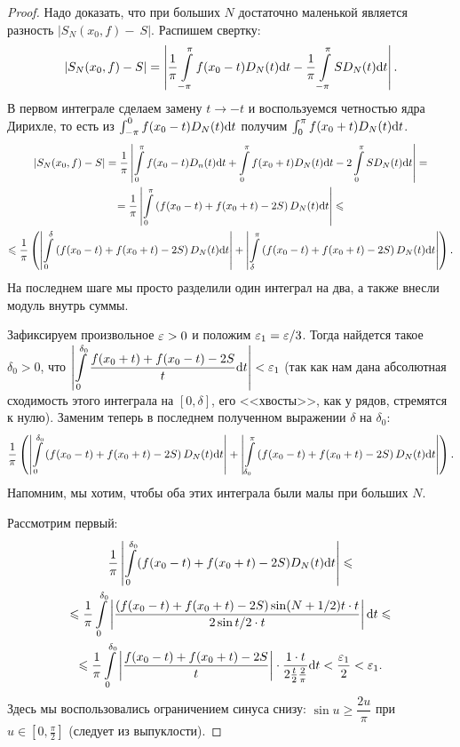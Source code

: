 \begin{proof}
Надо доказать, что при больших $N$ достаточно маленькой является разность $|S_N(x_0, f) -~S|$. Распишем свертку:
\begin{gather*}
|S_N(x_0, f) - S| = \left| \dfrac{1}{\pi} \int\limits_{-\pi}^{\pi}f(x_0 - t)D_N(t)\mathrm{d} t - \dfrac{1}{\pi} \int\limits_{-\pi}^{\pi}SD_N(t)\mathrm{d} t \right|.
\end{gather*}
В первом интеграле сделаем замену $t \to -t$ и воспользуемся четностью ядра Дирихле, то есть из $\int_{-\pi}^{0}f(x_0 - t)D_N(t)\mathrm{d} t$ получим $\int_0^\pi f(x_0 + t)D_N(t)\mathrm{d} t$.
\begin{gather*}
|S_N(x_0, f) - S| = \dfrac{1}{\pi} \left| \int\limits_0^\pi f(x_0 - t)D_n(t)\mathrm{d} t + \int\limits_0^{\pi} f(x_0 + t)D_N(t)\mathrm{d} t - 2\int\limits_0^\pi SD_N(t) \mathrm{d} t \right| = \\ = \dfrac{1}{\pi} \left| \int\limits_0^\pi \left( f(x_0 - t) + f(x_0 + t) - 2S  \right) D_N(t) \mathrm{d} t \right| \leqslant  \\
\leqslant \dfrac{1}{\pi} \left( \left| \int\limits_0^\delta \left( f(x_0 - t) + f(x_0 + t) - 2S  \right) D_N(t) \mathrm{d} t \right| + \left| \int\limits_\delta^\pi \left( f(x_0 - t) + f(x_0 + t) - 2S  \right) D_N(t) \mathrm{d} t \right| \right).
\end{gather*}
На последнем шаге мы просто разделили один интеграл на два, а также внесли модуль внутрь суммы.

Зафиксируем произвольное $\varepsilon > 0$ и положим $\varepsilon_1 = \varepsilon / 3$. Тогда найдется такое $\delta_0 > 0$, что $\left|\displaystyle \int\limits_0^{\delta_0}  \dfrac{f(x_0 + t) + f(x_0 - t) - 2S}{t}\mathrm{d} t \right| < \varepsilon_1$ (так как нам дана абсолютная сходимость этого интеграла на $[0, \delta]$, его <<хвосты>>, как у рядов, стремятся к нулю). Заменим теперь в последнем полученном выражении $\delta$ на $\delta_0$:
$$
\dfrac{1}{\pi} \left( \left| \int\limits_0^{\delta_0} \left( f(x_0 - t) + f(x_0 + t) - 2S  \right) D_N(t) \mathrm{d} t \right| + \left| \int\limits_{\delta_0}^\pi \left( f(x_0 - t) + f(x_0 + t) - 2S  \right) D_N(t) \mathrm{d} t \right| \right).
$$
Напомним, мы хотим, чтобы оба этих интеграла были малы при больших $N$.

Рассмотрим первый:
\begin{multline}
\dfrac{1}{\pi} \left| \int\limits_0^{\delta_0} ( f(x_0 - t) + f(x_0 + t) - 2S  ) D_N(t) \mathrm{d} t \right|\leqslant \\ \leqslant \dfrac{1}{\pi}  \int\limits_0^{\delta_0} \left| \dfrac{(f(x_0 - t) + f(x_0 + t) - 2S) \sin (N + 1/2)t \cdot t}{2 \sin t/2 \cdot t} \right|\mathrm{d} t \leqslant \\
\leqslant \dfrac{1}{\pi}  \int\limits_0^{\delta_0} \left| \dfrac{f(x_0 - t) + f(x_0 + t) - 2S}{t} \right|  \cdot \dfrac{1 \cdot t}{2 \frac{t}{2} \frac{2}{\pi}} \mathrm{d} t < \dfrac{\varepsilon_1}{2} < \varepsilon_1.
\end{multline}
Здесь мы воспользовались ограничением синуса снизу: $\sin u \geq \dfrac{2u}{\pi}$ при $ u \in [0, \frac{\pi}{2}]$ (следует из выпуклости).


\end{proof}
